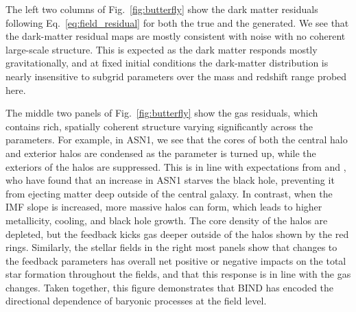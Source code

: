 \documentclass[linenumbers,trackchanges, twocolumn]{aastex701}
\begin{document}
The left two columns of Fig.~\ref{fig:butterfly} show the dark matter residuals following Eq.~\ref{eq:field_residual} for both the true and the generated. We see that the dark-matter residual maps are mostly consistent with noise with no coherent large-scale structure. This is expected as the dark matter responds mostly gravitationally, and at fixed initial conditions the dark-matter distribution is nearly insensitive to subgrid parameters over the mass and redshift range probed here. 

The middle two panels of Fig.~\ref{fig:butterfly} show the gas residuals, which contains rich, spatially coherent structure varying significantly across the parameters. For example, in ASN1, we see that the cores of both the central halo and exterior halos are condensed as the parameter is turned up, while the exteriors of the halos are suppressed. This is in line with expectations from \citet{Genel-2026} and \citet{Lee-2024}, who have found that an increase in ASN1 starves the black hole, preventing it from ejecting matter deep outside of the central galaxy.
In contrast, when the IMF slope is increased, more massive halos can form, which leads to higher metallicity, cooling, and black hole growth. The core density of the halos are depleted, but the feedback kicks gas deeper outside of the halos shown by the red rings. Similarly, the stellar fields in the right most panels show that changes to the feedback parameters has overall net positive or negative impacts on the total star formation throughout the fields, and that this response is in line with the gas changes. Taken together, this figure demonstrates that \textsc{BIND} has encoded the directional dependence of baryonic processes at the field level.

\end{document}
